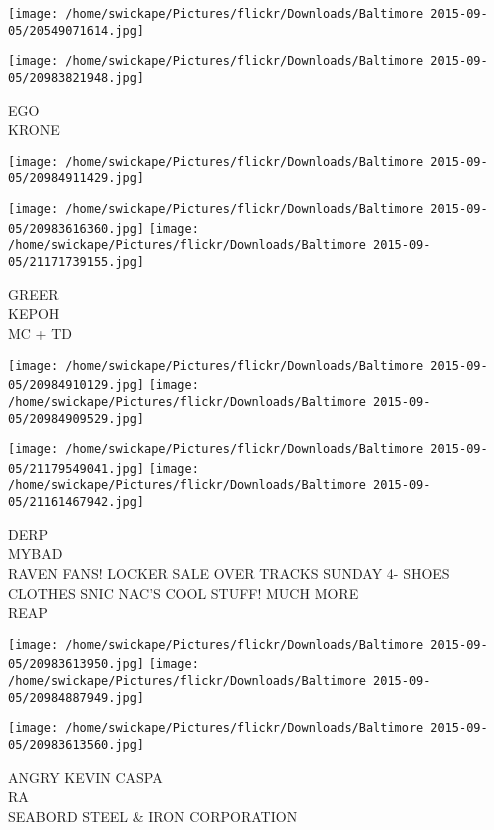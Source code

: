 \documentclass[10pt,letterpaper]{article}
\begin{document}
\texttt{[image: /home/swickape/Pictures/flickr/Downloads/Baltimore 2015-09-05/20549071614.jpg]}

\vspace{0.25in}
\texttt{[image: /home/swickape/Pictures/flickr/Downloads/Baltimore 2015-09-05/20983821948.jpg]}

EGO\\
KRONE\\
\pagebreak

\texttt{[image: /home/swickape/Pictures/flickr/Downloads/Baltimore 2015-09-05/20984911429.jpg]}

\vspace{0.25in}
\texttt{[image: /home/swickape/Pictures/flickr/Downloads/Baltimore 2015-09-05/20983616360.jpg]}
\texttt{[image: /home/swickape/Pictures/flickr/Downloads/Baltimore 2015-09-05/21171739155.jpg]}

GREER\\
KEPOH\\
MC + TD\\
\pagebreak

\texttt{[image: /home/swickape/Pictures/flickr/Downloads/Baltimore 2015-09-05/20984910129.jpg]}
\texttt{[image: /home/swickape/Pictures/flickr/Downloads/Baltimore 2015-09-05/20984909529.jpg]}

\texttt{[image: /home/swickape/Pictures/flickr/Downloads/Baltimore 2015-09-05/21179549041.jpg]}
\texttt{[image: /home/swickape/Pictures/flickr/Downloads/Baltimore 2015-09-05/21161467942.jpg]}

DERP\\
MYBAD\\
RAVEN FANS!  LOCKER SALE OVER TRACKS SUNDAY 4{-} SHOES CLOTHES SNIC NAC'S COOL STUFF!  MUCH MORE\\
REAP\\
\pagebreak

\texttt{[image: /home/swickape/Pictures/flickr/Downloads/Baltimore 2015-09-05/20983613950.jpg]}
\texttt{[image: /home/swickape/Pictures/flickr/Downloads/Baltimore 2015-09-05/20984887949.jpg]}

\vspace{0.25in}
\texttt{[image: /home/swickape/Pictures/flickr/Downloads/Baltimore 2015-09-05/20983613560.jpg]}

ANGRY KEVIN CASPA\\
RA\\
SEABORD STEEL \& IRON CORPORATION\\
\pagebreak
\end{document}
